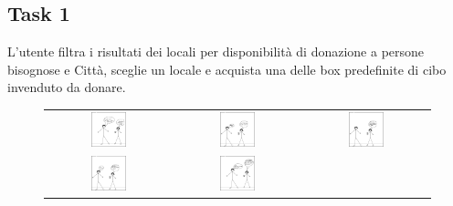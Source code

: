\documentclass{article}
\begin{document}
\subsection{Task 1}
L'utente filtra i risultati dei locali per disponibilità di donazione a persone bisognose e Città, sceglie un locale e acquista una delle box predefinite di cibo invenduto da donare.
\begin{figure}[H]
    \centering
    \begin{tabular}{ccc}
        \includegraphics[width=0.3\textwidth]{Storyboard/task1-img II versione/t1.1.png} &
        \includegraphics[width=0.3\textwidth]{Storyboard/task1-img II versione/t1.2.png} &
        \includegraphics[width=0.3\textwidth]{Storyboard/task1-img II versione/t1.3.png} \\
        \includegraphics[width=0.3\textwidth]{Storyboard/task1-img II versione/t1.4.png} &
        \includegraphics[width=0.3\textwidth]{Storyboard/task1-img II versione/t1.5.png} &

\end{tabular}
\end{figure}
\end{document}
